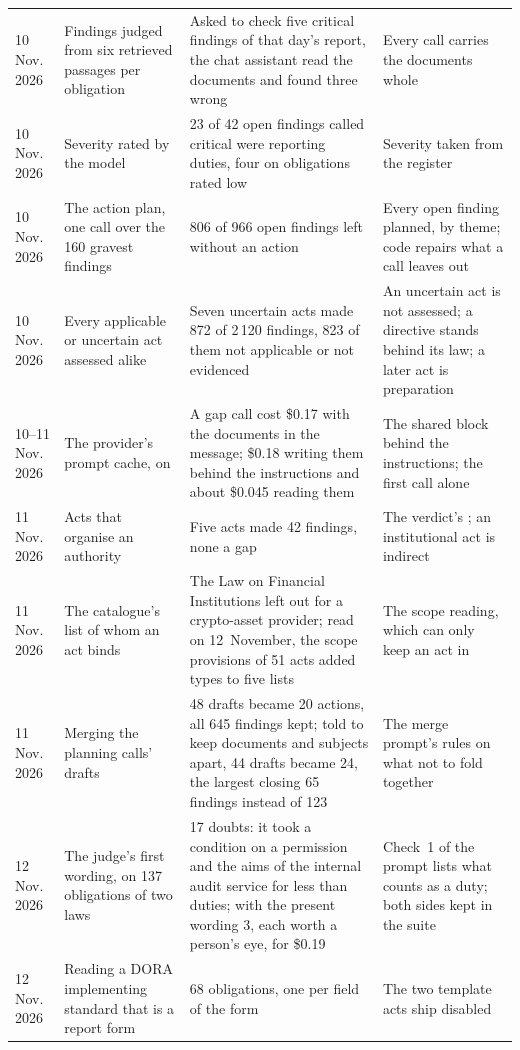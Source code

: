 \begin{xltabular}{\textwidth}{@{}L{17mm}L{37mm}YL{37mm}@{}}
10 Nov. 2026 & Findings judged from six retrieved passages per obligation & Asked to check five critical findings of that day's report, the chat assistant read the documents and found three wrong & Every call carries the documents whole \\
10 Nov. 2026 & Severity rated by the model & 23 of 42 open findings called critical were reporting duties, four on obligations rated low & Severity taken from the register \\
10 Nov. 2026 & The action plan, one call over the 160 gravest findings & 806 of 966 open findings left without an action & Every open finding planned, by theme; code repairs what a call leaves out \\
10 Nov. 2026 & Every applicable or uncertain act assessed alike & Seven uncertain acts made 872 of 2\,120 findings, 823 of them not applicable or not evidenced & An uncertain act is not assessed; a directive stands behind its law; a later act is preparation \\
10--11 Nov. 2026 & The provider's prompt cache, on  & A gap call cost \$0.17 with the documents in the message; \$0.18 writing them behind the instructions and about \$0.045 reading them & The shared block behind the instructions; the first call alone \\
11 Nov. 2026 & Acts that organise an authority & Five acts made 42 findings, none a gap & The verdict's ; an institutional act is indirect \\
11 Nov. 2026 & The catalogue's list of whom an act binds & The Law on Financial Institutions left out for a crypto-asset provider; read on 12~November, the scope provisions of 51 acts added types to five lists & The scope reading, which can only keep an act in \\
11 Nov. 2026 & Merging the planning calls' drafts & 48 drafts became 20 actions, all 645 findings kept; told to keep documents and subjects apart, 44 drafts became 24, the largest closing 65 findings instead of 123 & The merge prompt's rules on what not to fold together \\
12 Nov. 2026 & The judge's first wording, on 137 obligations of two laws & 17 doubts: it took a condition on a permission and the aims of the internal audit service for less than duties; with the present wording 3, each worth a person's eye, for \$0.19 & Check~1 of the prompt lists what counts as a duty; both sides kept in the suite  \\
12 Nov. 2026 & Reading a DORA implementing standard that is a report form & 68 obligations, one per field of the form & The two template acts ship disabled \\

\end{xltabular}
